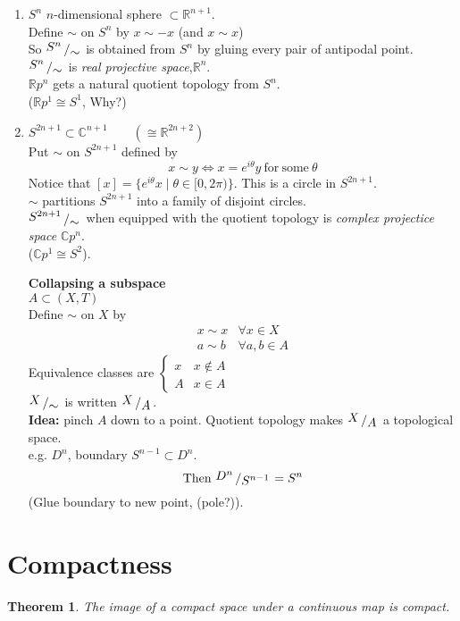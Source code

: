 \documentclass{article}
\newcommand{\R}{\mathbb{R}}
\newcommand{\C}{\mathbb{C}}
\newcommand{\quotient}[2]{{\raisebox{.2em}{$#1$}\left/\raisebox{-.2em}{$#2$}\right.}}
\newtheorem{theorem}{Theorem}[section]
\theoremstyle{remark}
\theoremstyle{example}
\theoremstyle{examples}
\begin{document}
\begin{enumerate}
		\item $S^n$ $n$-dimensional sphere $\subset \R^{n+1}$.\\
		Define $\sim$ on $S^n$ by $x \sim -x$ (and $x \sim x$)\\
		So $\quotient{S^n}{\sim}$ is obtained from $S^n$ by gluing every pair of antipodal point.\\
		$\quotient{S^n}{\sim}$ is \textit{real projective space},$\R ^n$.\\
		$\R p^n$ gets a natural quotient topology from $S^n$.\\
		($\R p^1 \cong S^1$, Why?)
		\item $S^{2n+1} \subset \C^{n+1}\qquad(\cong \R^{2n+2})$\\
		Put $\sim$ on $S^{2n+1}$ defined by \[x \sim y \iff x=e^{i \theta}y\ \mathrm{for\ some}\ \theta\]
		Notice that $[x]=\{e^{i\theta} x \mid \theta \in [0,2 \pi)\}$. This is a circle in $S^{2n+1}$.\\
		$\sim$ partitions $S^{2n+1}$ into a family of disjoint circles.\\
		$\quotient{S^{2n+1}}{\sim}$ when equipped with the quotient topology is \textit{complex projectice space} $\C p^n$.\\
		($\C p^1 \cong S^2$).
		
		\textbf{Collapsing a subspace}\\
		$A \subset (X,T)$\\
		Define $\sim$ on $X$ by \[\begin{matrix}
			x \sim x & \forall x \in X\\
			a \sim b & \forall a,b \in A
		\end{matrix}\]
		Equivalence classes are $\begin{cases}
			{x} & x \notin A\\
			A & x \in A
		\end{cases}$\\
		$\quotient{X}{\sim}$ is written $\quotient{X}{A}$.\\
		\textbf{Idea:} pinch $A$ down to a point. Quotient topology makes $\quotient{X}{A}$ a topological space.\\
		e.g. $D^n$, boundary $S^{n-1}\subset D^n$.\\
		\[\mathrm{Then}\ \quotient{D^n}{S^{n-1}}=S^n\]
		(Glue boundary to new point, (pole?)).
		
	\end{enumerate}

	\pagebreak
	\setcounter{section}{4}
	\section{Compactness}
	\setcounter{theorem}{8}
	\begin{theorem}
		The image of a compact space under a continuous map is compact.
	\end{theorem}
\end{document}
